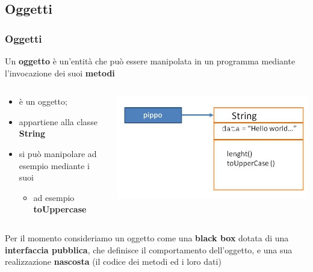 \subsection*{Oggetti}
\begin{frame}
\frametitle{Oggetti}
\begin{block}{}
Un \textbf{oggetto} è un'entità che può essere manipolata in un programma mediante l'invocazione dei suoi \textbf{metodi}
\end{block}
\begin{columns}
\begin{column}{0.5\textwidth}
\begin{block}{}
\begin{itemize}
\item {} è un oggetto;
\item appartiene alla classe \textbf{String}
\item si può manipolare ad esempio mediante i suoi 
\begin{itemize}
\item ad esempio \textbf{toUppercase}
\end{itemize}
\end{itemize}
\end{block}
\end{column}
\begin{column}{0.5\textwidth}
\includegraphics[scale=0.4]{images/classe.jpg}
\end{column}
\end{columns}
\begin{block}{}\footnotesize
Per il momento consideriamo un oggetto come una \textbf{black box} dotata di una \textbf{interfaccia pubblica}, che definisce il comportamento dell'oggetto, e una sua realizzazione \textbf{nascosta} (il codice dei metodi ed i loro dati)
\end{block}
\end{frame}

